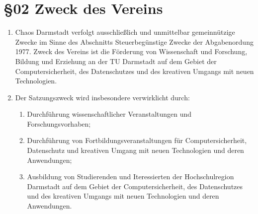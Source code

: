 \section*{§02 Zweck des Vereins}
\begin{enumerate}
\item Chaos Darmstadt verfolgt ausschließlich und unmittelbar gemeinnützige
Zwecke im Sinne des Abschnitts \textquotedbl{}Steuerbegünstige Zwecke\textquotedbl{}
der Abgabenordung 1977. Zweck des Vereins ist die Förderung von Wissenschaft
und Forschung, Bildung und Erziehung an der TU Darmstadt auf dem Gebiet
der Computersicherheit, des Datenschutzes und des kreativen Umgangs
mit neuen Technologien.
\item Der Satzungszweck wird insbesondere verwirklicht durch:

\begin{enumerate}
\item Durchführung wissenschaftlicher Veranstaltungen und Forschungsvorhaben;
\item Durchführung von Fortbildungsveranstaltungen für Computersicherheit,
Datenschutz und kreativen Umgang mit neuen Technologien und deren
Anwendungen;
\item Ausbildung von Studierenden und Iteressierten der Hochschulregion
Darmstadt auf dem Gebiet der Computersicherheit, des Datenschutzes
und des kreativen Umgangs mit neuen Technologien und deren Anwendungen.
\end{enumerate}
\end{enumerate}